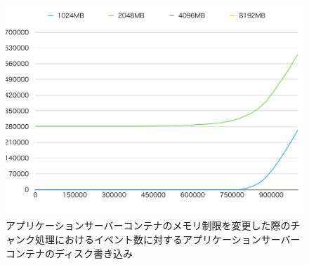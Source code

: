\documentclass[../../../../../main]{subfiles}
\begin{document}
    \begin{figure}[H]
        \centering
        \includegraphics[width=12cm]{graph}
        \caption{アプリケーションサーバーコンテナのメモリ制限を変更した際のチャンク処理におけるイベント数に対するアプリケーションサーバーコンテナのディスク書き込み}
        \label{fig:stream-change-app-memory-limit-app-disk-in-app_4_db_1_1024}
    \end{figure}
\end{document}
